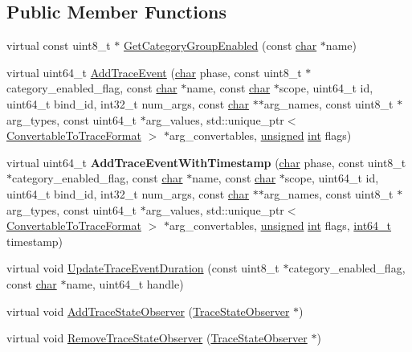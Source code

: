 \subsection*{Public Member Functions}
\begin{DoxyCompactItemize}
\item 
virtual const uint8\+\_\+t $\ast$ \mbox{\hyperlink{classv8_1_1TracingController_af3c0fcec8fe93b18a89392686cfedfe5}{Get\+Category\+Group\+Enabled}} (const \mbox{\hyperlink{classchar}{char}} $\ast$name)
\item 
virtual uint64\+\_\+t \mbox{\hyperlink{classv8_1_1TracingController_ad1e234b340ea8f9f1e3386aa21dad5dd}{Add\+Trace\+Event}} (\mbox{\hyperlink{classchar}{char}} phase, const uint8\+\_\+t $\ast$category\+\_\+enabled\+\_\+flag, const \mbox{\hyperlink{classchar}{char}} $\ast$name, const \mbox{\hyperlink{classchar}{char}} $\ast$scope, uint64\+\_\+t id, uint64\+\_\+t bind\+\_\+id, int32\+\_\+t num\+\_\+args, const \mbox{\hyperlink{classchar}{char}} $\ast$$\ast$arg\+\_\+names, const uint8\+\_\+t $\ast$arg\+\_\+types, const uint64\+\_\+t $\ast$arg\+\_\+values, std\+::unique\+\_\+ptr$<$ \mbox{\hyperlink{classv8_1_1ConvertableToTraceFormat}{Convertable\+To\+Trace\+Format}} $>$ $\ast$arg\+\_\+convertables, \mbox{\hyperlink{classunsigned}{unsigned}} \mbox{\hyperlink{classint}{int}} flags)
\item 
\mbox{\label{classv8_1_1TracingController_a09a16f1d491260f0fef48eaa3a0a28d7}} 
virtual uint64\+\_\+t {\bfseries Add\+Trace\+Event\+With\+Timestamp} (\mbox{\hyperlink{classchar}{char}} phase, const uint8\+\_\+t $\ast$category\+\_\+enabled\+\_\+flag, const \mbox{\hyperlink{classchar}{char}} $\ast$name, const \mbox{\hyperlink{classchar}{char}} $\ast$scope, uint64\+\_\+t id, uint64\+\_\+t bind\+\_\+id, int32\+\_\+t num\+\_\+args, const \mbox{\hyperlink{classchar}{char}} $\ast$$\ast$arg\+\_\+names, const uint8\+\_\+t $\ast$arg\+\_\+types, const uint64\+\_\+t $\ast$arg\+\_\+values, std\+::unique\+\_\+ptr$<$ \mbox{\hyperlink{classv8_1_1ConvertableToTraceFormat}{Convertable\+To\+Trace\+Format}} $>$ $\ast$arg\+\_\+convertables, \mbox{\hyperlink{classunsigned}{unsigned}} \mbox{\hyperlink{classint}{int}} flags, \mbox{\hyperlink{classint64__t}{int64\+\_\+t}} timestamp)
\item 
virtual void \mbox{\hyperlink{classv8_1_1TracingController_ac1fda6cdae5f6515b896b3df05d5a97e}{Update\+Trace\+Event\+Duration}} (const uint8\+\_\+t $\ast$category\+\_\+enabled\+\_\+flag, const \mbox{\hyperlink{classchar}{char}} $\ast$name, uint64\+\_\+t handle)
\item 
virtual void \mbox{\hyperlink{classv8_1_1TracingController_a7b86361ffadff46018a348fd2aa01061}{Add\+Trace\+State\+Observer}} (\mbox{\hyperlink{classv8_1_1TracingController_1_1TraceStateObserver}{Trace\+State\+Observer}} $\ast$)
\item 
virtual void \mbox{\hyperlink{classv8_1_1TracingController_ab8d5b3ac795188effb423fa2c0514353}{Remove\+Trace\+State\+Observer}} (\mbox{\hyperlink{classv8_1_1TracingController_1_1TraceStateObserver}{Trace\+State\+Observer}} $\ast$)
\end{DoxyCompactItemize}


